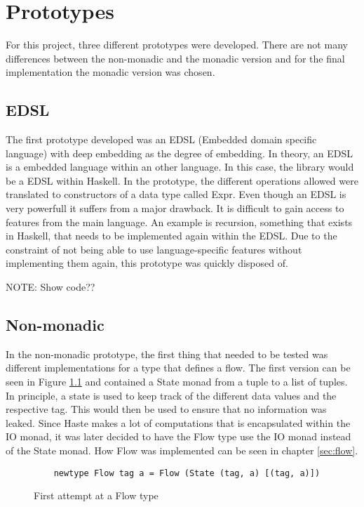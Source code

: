 \chapter{Prototypes}
\label{chapter:prototypes}
For this project, three different prototypes were developed. There are not many differences between the non-monadic and the monadic version and for the final implementation the monadic version was chosen.
\section{EDSL}
The first prototype developed was an EDSL (Embedded domain specific language)\cite{haskell_edsl} with deep embedding as the degree of embedding. In theory, an EDSL is a embedded language within an other language. In this case, the library would be a EDSL within Haskell. In the prototype, the different operations allowed were translated to constructors of a data type called Expr. Even though an EDSL is very powerfull it suffers from a major drawback. It is difficult to gain access to features from the main language. An example is recursion, something that exists in Haskell, that needs to be implemented again within the EDSL. Due to the constraint of not being able to use language-specific features without implementing them again, this prototype was quickly disposed of.

NOTE: Show code??
\section{Non-monadic}
In the non-monadic prototype, the first thing that needed to be tested was different implementations for a type that defines a flow. The first version can be seen in Figure \ref{fig:first_flow} and contained a State monad from a tuple to a list of tuples. In principle, a state is used to keep track of the different data values and the respective tag. This would then be used to ensure that no information was leaked. Since Haste makes a lot of computations that is encapsulated within the IO monad, it was later decided to have the Flow type use the IO monad instead of the State monad. How Flow was implemented can be seen in chapter \ref{sec:flow}.
\begin{figure}[h]
  \lstset{language=Haskell}
  \begin{lstlisting}
    newtype Flow tag a = Flow (State (tag, a) [(tag, a)])
  \end{lstlisting}
  \caption{First attempt at a Flow type}
  \label{fig:first_flow}
\end{figure}

